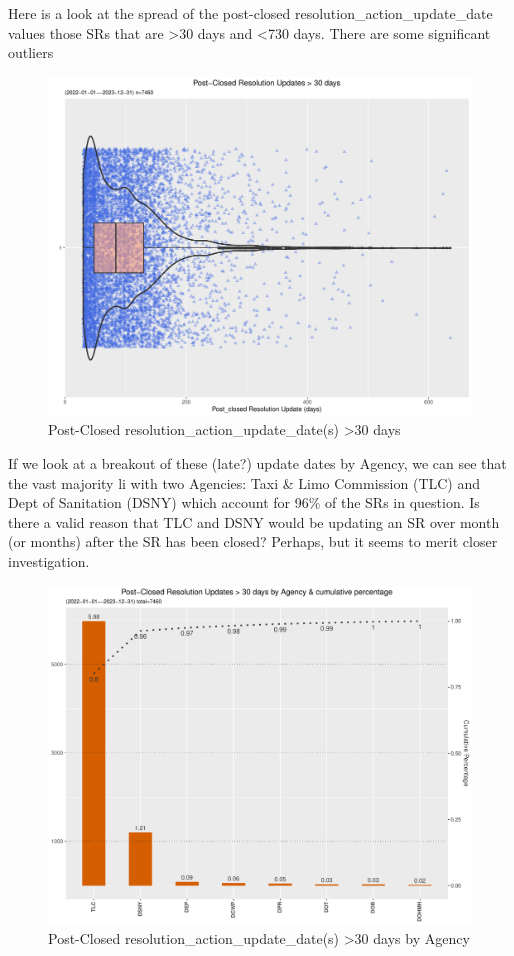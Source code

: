 \documentclass[12pt, titlepage]{article}
\begin{document}
{	Here is a look at the spread of the post-closed resolution\_action\_update\_date values those SRs 
	that are \textgreater30 days and \textless{}730 days. There are some significant outliers 
	
	\begin{figure}[tbp]
		\centering
		\includegraphics[width = \textwidth]{post_closed_violin.pdf}
		\caption{Post-Closed resolution\_action\_update\_date(s) \textgreater30 days}
		\label{fig:resolution-violin}
	\end{figure}		

	If we look at a breakout of these (late?) update dates by Agency, we can see that the vast majority li with two
	Agencies: Taxi \& Limo Commission (TLC) and Dept of Sanitation (DSNY) which account for 96\% of the SRs in
	question.  Is there a valid reason that TLC and DSNY would be updating an SR over month (or months) after
	the SR has been closed? Perhaps, but it seems to merit closer investigation. 

	\begin{figure}[tbp]
		\centering
		\includegraphics[width = \textwidth]{postClosedBarChart.pdf}
		\caption{Post-Closed resolution\_action\_update\_date(s) \textgreater30 days by Agency}
		\label{fig:resolution-by-agency}
	\end{figure}		

}
\end{document}
